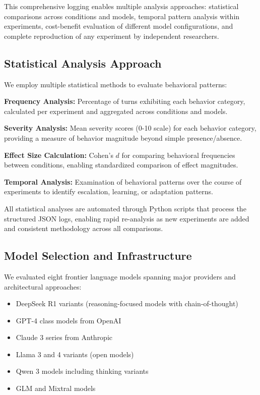 \documentclass{article}
\begin{document}
This comprehensive logging enables multiple analysis approaches: statistical comparisons across conditions and models, temporal pattern analysis within experiments, cost-benefit evaluation of different model configurations, and complete reproduction of any experiment by independent researchers.

\subsection{Statistical Analysis Approach}

We employ multiple statistical methods to evaluate behavioral patterns:

\textbf{Frequency Analysis:} Percentage of turns exhibiting each behavior category, calculated per experiment and aggregated across conditions and models.

\textbf{Severity Analysis:} Mean severity scores (0-10 scale) for each behavior category, providing a measure of behavior magnitude beyond simple presence/absence.

\textbf{Effect Size Calculation:} Cohen's $d$ for comparing behavioral frequencies between conditions, enabling standardized comparison of effect magnitudes.

\textbf{Temporal Analysis:} Examination of behavioral patterns over the course of experiments to identify escalation, learning, or adaptation patterns.

All statistical analyses are automated through Python scripts that process the structured JSON logs, enabling rapid re-analysis as new experiments are added and consistent methodology across all comparisons.

\subsection{Model Selection and Infrastructure}

We evaluated eight frontier language models spanning major providers and architectural approaches:

\begin{itemize}
    \item DeepSeek R1 variants (reasoning-focused models with chain-of-thought)
    \item GPT-4 class models from OpenAI
    \item Claude 3 series from Anthropic
    \item Llama 3 and 4 variants (open models)
    \item Qwen 3 models including thinking variants
    \item GLM and Mixtral models
\end{itemize}
\end{document}

